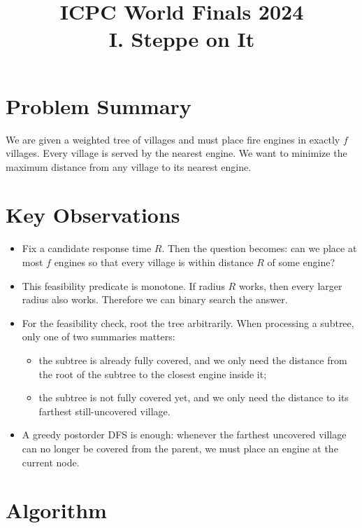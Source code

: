 \documentclass[11pt]{article}
\title{ICPC World Finals 2024\\I. Steppe on It}
\author{}
\date{}
\begin{document}
\maketitle

\section*{Problem Summary}

We are given a weighted tree of villages and must place fire engines in exactly $f$ villages. Every village is served by the nearest engine. We want to minimize the maximum distance from any village to its nearest engine.

\section*{Key Observations}

\begin{itemize}[leftmargin=*]
    \item Fix a candidate response time $R$. Then the question becomes: can we place at most $f$ engines so that every village is within distance $R$ of some engine?
    \item This feasibility predicate is monotone. If radius $R$ works, then every larger radius also works. Therefore we can binary search the answer.
    \item For the feasibility check, root the tree arbitrarily. When processing a subtree, only one of two summaries matters:
    \begin{itemize}[leftmargin=*]
        \item the subtree is already fully covered, and we only need the distance from the root of the subtree to the closest engine inside it;
        \item the subtree is not fully covered yet, and we only need the distance to its farthest still-uncovered village.
    \end{itemize}
    \item A greedy postorder DFS is enough: whenever the farthest uncovered village can no longer be covered from the parent, we must place an engine at the current node.
\end{itemize}

\section*{Algorithm}
\end{document}

